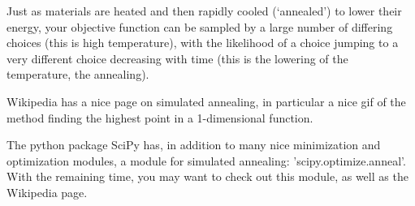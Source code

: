 \documentclass{article}
\begin{document}
  Just as materials are heated and then rapidly cooled
  (`annealed') to lower their energy, 
  your objective function can be sampled by a large number of differing choices
  (this is high temperature), with the likelihood of a choice 
  jumping to a very different choice decreasing with time
  (this is the lowering of the temperature, the annealing).

  Wikipedia has a nice page on simulated annealing, in particular
  a nice gif of the method finding the highest point in a
  1-dimensional function.

  The python package SciPy has, in addition to many nice 
  minimization and optimization modules, a module for
  simulated annealing: 'scipy.optimize.anneal'. With the
  remaining time, you may want to check out this module,
  as well as the Wikipedia page.
\end{document}
